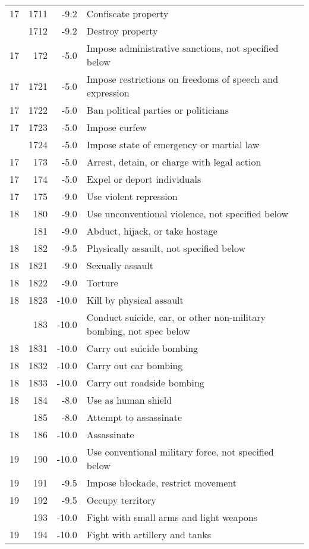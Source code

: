\documentclass[10pt,]{article}
\begin{document}
\begin{longtable}[t]{rrrl}
17 & 1711 & -9.2 & Confiscate property\\
\addlinespace
17 & 1712 & -9.2 & Destroy property\\
17 & 172 & -5.0 & Impose administrative sanctions, not specified below\\
17 & 1721 & -5.0 & Impose restrictions on freedoms of speech and expression\\
17 & 1722 & -5.0 & Ban political parties or politicians\\
17 & 1723 & -5.0 & Impose curfew\\
\addlinespace
17 & 1724 & -5.0 & Impose state of emergency or martial law\\
17 & 173 & -5.0 & Arrest, detain, or charge with legal action\\
17 & 174 & -5.0 & Expel or deport individuals\\
17 & 175 & -9.0 & Use violent repression\\
18 & 180 & -9.0 & Use unconventional violence, not specified below\\
\addlinespace
18 & 181 & -9.0 & Abduct, hijack, or take hostage\\
18 & 182 & -9.5 & Physically assault, not specified below\\
18 & 1821 & -9.0 & Sexually assault\\
18 & 1822 & -9.0 & Torture\\
18 & 1823 & -10.0 & Kill by physical assault\\
\addlinespace
18 & 183 & -10.0 & Conduct suicide, car, or other non-military bombing, not spec below\\
18 & 1831 & -10.0 & Carry out suicide bombing\\
18 & 1832 & -10.0 & Carry out car bombing\\
18 & 1833 & -10.0 & Carry out roadside bombing\\
18 & 184 & -8.0 & Use as human shield\\
\addlinespace
18 & 185 & -8.0 & Attempt to assassinate\\
18 & 186 & -10.0 & Assassinate\\
19 & 190 & -10.0 & Use conventional military force, not specified below\\
19 & 191 & -9.5 & Impose blockade, restrict movement\\
19 & 192 & -9.5 & Occupy territory\\
\addlinespace
19 & 193 & -10.0 & Fight with small arms and light weapons\\
19 & 194 & -10.0 & Fight with artillery and tanks\\

\end{longtable}
\end{document}

